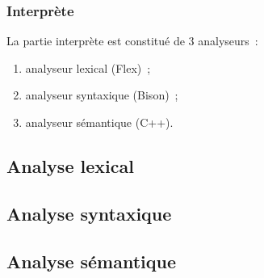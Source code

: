 \begin{frame}
\frametitle{Interprète}
La partie interprète est constitué de 3 analyseurs~:
\begin{enumerate}
\item analyseur lexical (Flex)~;
\item analyseur syntaxique (Bison)~;
\item analyseur sémantique (C++).
\end{enumerate}
\end{frame}

\subsection{Analyse lexical}


\subsection{Analyse syntaxique}


\subsection{Analyse sémantique}

